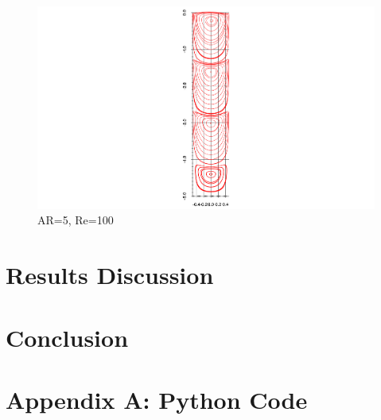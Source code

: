 \documentclass[twocolumn,10pt]{asme2ej}
\begin{document}
\begin{figure}[tb]
\begin{center}
\includegraphics[height=1.4\textwidth]{figure/AR5-Re100 streamFunction axis final.pdf}
\caption{AR=5, Re=100}
\label{}
\end{center}
\end{figure}


\section{Results Discussion}

\section{Conclusion}

\nocite{*}



\clearpage
\onecolumn
\appendix       %
\section*{Appendix A: Python Code}



\end{document}

